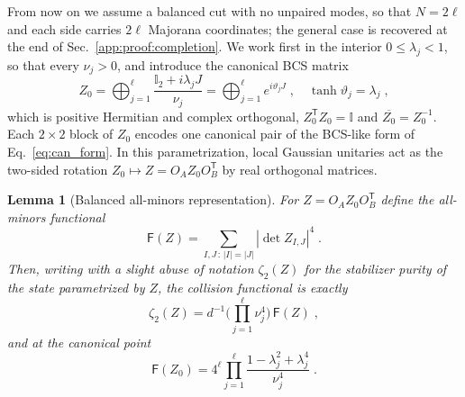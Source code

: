 \documentclass[prx,twocolumn,superscriptaddress,aps,10pt, frontmatterverbose, reprint,footinbib,longbibliography=true]{revtex4-2}
\newtheorem{lemma}{Lemma}
\newcommand{\trans}{\mathsf{T}}
\begin{document}
From now on we assume a balanced cut with no unpaired modes, so that $N=2\ell$ and each side carries $2\ell$ Majorana coordinates; the general case is recovered at the end of Sec.~\ref{app:proof:completion}.
We work first in the interior $0\le\lambda_j<1$, so that every $\nu_j>0$,
and introduce the canonical BCS matrix~\cite{Mbeng2024}
\begin{equation}
Z_0=\bigoplus_{j=1}^{\ell}\frac{\mathbb{I}_2+i\lambda_jJ}{\nu_j}=\bigoplus_{j=1}^{\ell}e^{i\vartheta_jJ}\;,\quad \tanh \vartheta_j=\lambda_j\;,
    \label{eq:Z0}
\end{equation} 
which is positive Hermitian and complex orthogonal, $Z_0^{\trans}Z_0=\mathbb{I}$ and $\overline{Z_0}=Z_0^{-1}$. Each $2\times2$ block of $Z_0$ encodes one canonical pair of the BCS-like form of Eq.~\eqref{eq:can_form}. In this parametrization, local Gaussian unitaries act as the two-sided rotation $Z_0\mapsto Z=O_AZ_0O_B^{\trans}$ by real orthogonal matrices.

\begin{lemma}[Balanced all-minors representation]
\label{lem:all-minors}
For $Z=O_AZ_0O_B^{\trans}$ define the all-minors functional
\begin{equation}
    \mathsf{F}(Z)=\sum_{I,J\,:\,|I|=|J|}\left|\det Z_{I,J}\right|^4\;.
    \label{eq:F-definition}
\end{equation}
Then, writing with a slight abuse of notation $\zeta_2(Z)$ for the stabilizer purity of the state parametrized by $Z$, the collision functional is exactly
\begin{equation}\zeta_2(Z)=d^{-1}\Big(\prod_{j=1}^{\ell}\nu_j^4\Big)\,\mathsf{F}(Z)\;,
    \label{eq:physical-F}
\end{equation}
and at the canonical point
\begin{equation}
    \mathsf{F}(Z_0)=4^{\ell}\prod_{j=1}^{\ell}\frac{1-\lambda_j^2+\lambda_j^4}{\nu_j^4}\;.
    \label{eq:F-canonical}
\end{equation}
\end{lemma}
\end{document}
